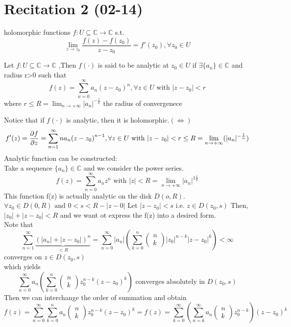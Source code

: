 \section{Recitation 2 (02-14)}
holomorphic functions $ f:U\subseteq \mathbb{C}\rightarrow\mathbb{C} $ s.t.
$$
    \lim_{z\rightarrow z_0}\frac{f(z)-f(z_0)}{z-z_0}=f'(z_0),\forall z_0\in U
$$  
\begin{definition}{}
Let $ f :U\subseteq \mathbb{C}\rightarrow\mathbb{C}$ ,Then $ f(\cdot)  $ is said to be analytic at $ z_0\in U $ if $\exists   \{a_n\}\in\mathbb{C}$ and radius r>0
such that$$
    f(z)=\sum_{n=0}^{\infty}a_n{(z-z_0)}^n,\forall z\in U \text{ with } |z-z_0|<r
$$ 
where $ r\leq R=\lim_{n\rightarrow+\infty}|a_n|^{-\frac{1}{n}} $ the radius of convergenece 
\end{definition}
Notice that if $ f(\cdot) $ is analytic, then it is holomorphic.$ (\Leftrightarrow)$
$$
    f'(z)=\pdv{f}{z}=\sum_{n=1}^{\infty}na_n{(z-z_0)}^{n-1},\forall z\in U \text{ with } |z-z_0|<r\leq R =\lim_{n\rightarrow+\infty}(|a_n|^{-\frac{1}{n}})
$$ 
Analytic function can be constructed:
\\ Take a sequence $\{a_n\}\in \mathbb{C}$ and we consider the power series.
$$
    f(z)=\sum_{n=0}^{\infty}a_nz^n \text{ with } |z|<R = \lim_{n\rightarrow+\infty}|a_n|^{1\frac{1}{n}}$$ 
This function f(z) is actually analytic on the disk $ D(o,R)$.
\\$ \forall z_0\in D(0,R)\text{ and }0<s<R-|z-0| $ Let $ |z-z_0|<s\text{  i.e. }z\in D(z_0,s) $  
Then,$ |z_0|+|z-z_0|<R $ and we want ot express the f(z) into a desired form.
\\Note that
$$
    \sum_{n=1}^{\infty}\underbrace{(|a_n|+|z-z_0|)^n}_{<R}=\sum_{n=0}^{\infty}|a_n|(\sum_{k=0}^{n}\begin{pmatrix}n\\k\end{pmatrix}|z_0|^{n-k}|z-z_0|^k)<\infty
$$  
converges on $ z\in D(z_0,s) $ 
\\which yields
$$
\sum_{n=0}^{\infty}a_n(\sum_{k=0}^{n}\begin{pmatrix}n\\k\end{pmatrix}z_0^{n-k}(z-z_0)^k) \text{ converges absolutely in } D(z_0,s)
$$ 
Then we can interchange the order of summation and obtain
$$
    f(z)=\sum_{n=0}^{\infty}\sum_{k=0}^{n}a_n\begin{pmatrix}n\\k\end{pmatrix}z_0^{n-k}(z-z_0)^k=f(z)=\sum_{k=0}^{\infty}(\sum_{n=k}^{\infty}a_n\begin{pmatrix}n\\k\end{pmatrix}z_0^{n-k})(z-z_0)^k
$$ 
